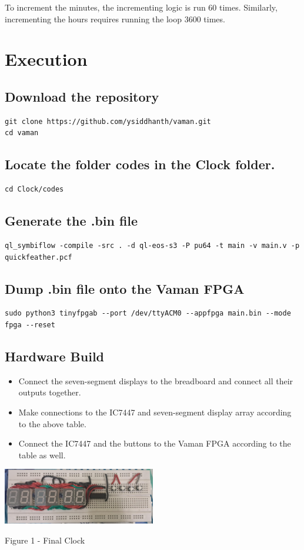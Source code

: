 \documentclass[conference]{IEEEtran}
\begin{document}
To increment the minutes, the incrementing logic is run 60 times. Similarly, incrementing the hours requires running the loop 3600 times.

\section{Execution}
\subsection{Download the repository}
\begin{lstlisting}
git clone https://github.com/ysiddhanth/vaman.git
cd vaman
\end{lstlisting}

\subsection{Locate the folder codes in the Clock folder.}
\begin{lstlisting}
cd Clock/codes
\end{lstlisting}

\subsection{Generate the .bin file}
\begin{footnotesize}
\begin{lstlisting}
ql_symbiflow -compile -src . -d ql-eos-s3 -P pu64 -t main -v main.v -p quickfeather.pcf
\end{lstlisting}
\end{footnotesize}

\subsection{Dump .bin file onto the Vaman FPGA}
\begin{footnotesize}
\begin{lstlisting}
sudo python3 tinyfpgab --port /dev/ttyACM0 --appfpga main.bin --mode fpga --reset
\end{lstlisting}
\end{footnotesize}

\subsection{Hardware Build}
\begin{itemize}
    \item Connect the seven-segment displays to the breadboard and connect all their outputs together.
    \item Make connections to the IC7447 and seven-segment display array according to the above table.
    \item Connect the IC7447 and the buttons to the Vaman FPGA according to the table as well.
\end{itemize}

\includegraphics[width=0.5\textwidth]{figs/clock.jpeg}
\centerline{Figure 1 - Final Clock}
\end{document}
